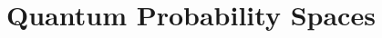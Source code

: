 \documentclass{article}
\theoremstyle{remark}
\newcommand{\imposs}{{\mbox{\wesa{impossible}}}}
\newcommand{\likely}{{\mbox{\wesa{likely}}}}
\newcommand{\unlikely}{{\mbox{\wesa{unlikely}}}}
\newcommand{\necess}{{\mbox{\wesa{certain}}}}
\begin{document}

\section{Quantum Probability Spaces}
\end{document}
